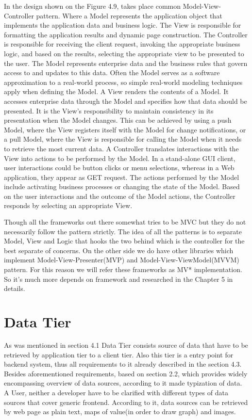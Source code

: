     In the design shown on the Figure 4.9, takes place common Model-View-Controller pattern. Where a Model represents the application object that implements the application data and business logic. The View is responsible for formatting the application results and dynamic page construction. The Controller is responsible for receiving the client request, invoking the appropriate business logic, and based on the results, selecting the appropriate view to be presented to the user. The Model represents enterprise data and the business rules that govern access to and updates to this data. Often the Model serves as a software approximation to a real-world process, so simple real-world modeling techniques apply when defining the Model. A View renders the contents of a Model. It accesses enterprise data through the Model and specifies how that data should be presented. It is the View's responsibility to maintain consistency in its presentation when the Model changes. This can be achieved by using a push Model, where the View registers itself with the Model for change notifications, or a pull Model, where the View is responsible for calling the Model when it needs to retrieve the most current data. A Controller translates interactions with the View into actions to be performed by the Model. In a stand-alone GUI client, user interactions could be button clicks or menu selections, whereas in a Web application, they appear as GET request. The actions performed by the Model include activating business processes or changing the state of the Model. Based on the user interactions and the outcome of the Model actions, the Controller responds by selecting an appropriate View. 

  Though all the frameworks out there somewhat tries to be MVC but they do not necessarily follow the pattern strictly. The idea of all the patterns is to separate Model, View and Logic that hooks the two behind which is the controller for the best separate of concerns. On the other side we do have other libraries which implement Model-View-Presenter(MVP) and Model-View-ViewModel(MVVM) pattern. For this reason we will refer these frameworks as MV* implementation. So it's much more depends on framework and researched in the Chapter 5 in details.
      

\section{Data Tier}
   As was mentioned in section 4.1 Data Tier consists source of data that have to be retrieved by application tier to a client tier. Also this tier is a entry point for backend system, thus all requirements to it already described in the section 4.3. Besides aforementioned requirements, based on section 2.2, which provides widely encompassing overview of data sources, according to it made typization of data. A User, neither a developer have to be clarified with different types of data sources that cover generic frontend. According to it, data sources can be retrieved by web page as plain text, maps of value(in order to draw graph) and images.

